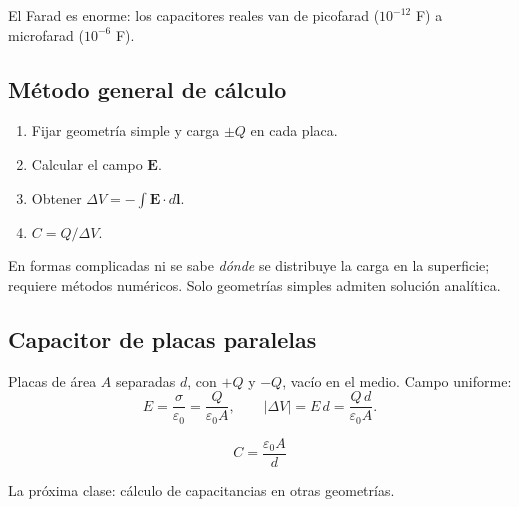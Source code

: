 \documentclass[12pt,a4paper]{article}
\begin{document}
\begin{notebox}[Escala]
  El Farad es enorme: los capacitores reales van de picofarad
  ($10^{-12}$ F) a microfarad ($10^{-6}$ F).
\end{notebox}

\subsection{Método general de cálculo}

\begin{enumerate}[nosep]
  \item Fijar geometría simple y carga $\pm Q$ en cada placa.
  \item Calcular el campo $\mathbf{E}$.
  \item Obtener $\Delta V = -\int \mathbf{E}\cdot d\mathbf{l}$.
  \item $C = Q/\Delta V$.
\end{enumerate}

\begin{warnbox}
  En formas complicadas ni se sabe \emph{dónde} se distribuye la carga en
  la superficie; requiere métodos numéricos. Solo geometrías simples
  admiten solución analítica.
\end{warnbox}

\subsection{Capacitor de placas paralelas}

Placas de área $A$ separadas $d$, con $+Q$ y $-Q$, vacío en el medio.
Campo uniforme:
\[
E = \frac{\sigma}{\varepsilon_0} = \frac{Q}{\varepsilon_0 A},
\qquad
|\Delta V| = E\,d = \frac{Q\,d}{\varepsilon_0 A}.
\]

\begin{keybox}
  \[
  \boxed{C = \frac{\varepsilon_0 A}{d}}
  \]
\end{keybox}

La próxima clase: cálculo de capacitancias en otras geometrías.
\end{document}
